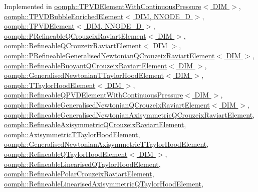 Implemented in \hyperlink{classoomph_1_1TPVDElementWithContinuousPressure_a3be09b442e13efa2e91f936e59034670}{oomph\+::\+T\+P\+V\+D\+Element\+With\+Continuous\+Pressure$<$ D\+I\+M $>$}, \hyperlink{classoomph_1_1TPVDBubbleEnrichedElement_ab8cb112f848a59cd54f14e72143927eb}{oomph\+::\+T\+P\+V\+D\+Bubble\+Enriched\+Element$<$ D\+I\+M, N\+N\+O\+D\+E\+\_\+D $>$}, \hyperlink{classoomph_1_1TPVDElement_aa23910847f4faa1d3701756c0f5a1e58}{oomph\+::\+T\+P\+V\+D\+Element$<$ D\+I\+M, N\+N\+O\+D\+E\+\_\+D $>$}, \hyperlink{classoomph_1_1PRefineableQCrouzeixRaviartElement_a4f29431659c8fb00cd2b56b21bcb722c}{oomph\+::\+P\+Refineable\+Q\+Crouzeix\+Raviart\+Element$<$ D\+I\+M $>$}, \hyperlink{classoomph_1_1RefineableQCrouzeixRaviartElement_aca4403f291e107cfcbf34009647c0527}{oomph\+::\+Refineable\+Q\+Crouzeix\+Raviart\+Element$<$ D\+I\+M $>$}, \hyperlink{classoomph_1_1PRefineableGeneralisedNewtonianQCrouzeixRaviartElement_ad41a2cd5f7ba136c2db47404e23b3bff}{oomph\+::\+P\+Refineable\+Generalised\+Newtonian\+Q\+Crouzeix\+Raviart\+Element$<$ D\+I\+M $>$}, \hyperlink{classoomph_1_1RefineableBuoyantQCrouzeixRaviartElement_a868eb9a7f06469da529dbbc5b1efe34e}{oomph\+::\+Refineable\+Buoyant\+Q\+Crouzeix\+Raviart\+Element$<$ D\+I\+M $>$}, \hyperlink{classoomph_1_1GeneralisedNewtonianTTaylorHoodElement_aa01c42f2e33c0fe78dfedceadd7ae78e}{oomph\+::\+Generalised\+Newtonian\+T\+Taylor\+Hood\+Element$<$ D\+I\+M $>$}, \hyperlink{classoomph_1_1TTaylorHoodElement_a88de8397e5afde8e3d5bb2639d1b91ff}{oomph\+::\+T\+Taylor\+Hood\+Element$<$ D\+I\+M $>$}, \hyperlink{classoomph_1_1RefineableQPVDElementWithContinuousPressure_a4cf706224993a10a0c774a314d4c25c4}{oomph\+::\+Refineable\+Q\+P\+V\+D\+Element\+With\+Continuous\+Pressure$<$ D\+I\+M $>$}, \hyperlink{classoomph_1_1RefineableGeneralisedNewtonianQCrouzeixRaviartElement_ac4a1100a3a8dc6f4994b622e50a76166}{oomph\+::\+Refineable\+Generalised\+Newtonian\+Q\+Crouzeix\+Raviart\+Element$<$ D\+I\+M $>$}, \hyperlink{classoomph_1_1RefineableGeneralisedNewtonianAxisymmetricQCrouzeixRaviartElement_a82be46c378226d5588fe8aeda0cef491}{oomph\+::\+Refineable\+Generalised\+Newtonian\+Axisymmetric\+Q\+Crouzeix\+Raviart\+Element}, \hyperlink{classoomph_1_1RefineableAxisymmetricQCrouzeixRaviartElement_a45ed9a2e816c20c88fd9f375899657c3}{oomph\+::\+Refineable\+Axisymmetric\+Q\+Crouzeix\+Raviart\+Element}, \hyperlink{classoomph_1_1AxisymmetricTTaylorHoodElement_a2a8cccdcdfd71e3c5f4c4ce07189442c}{oomph\+::\+Axisymmetric\+T\+Taylor\+Hood\+Element}, \hyperlink{classoomph_1_1GeneralisedNewtonianAxisymmetricTTaylorHoodElement_a0630c3c5533051b6f0e348571bd0c3ce}{oomph\+::\+Generalised\+Newtonian\+Axisymmetric\+T\+Taylor\+Hood\+Element}, \hyperlink{classoomph_1_1RefineableQTaylorHoodElement_a216582f193bf05ba8baf3ef3683da788}{oomph\+::\+Refineable\+Q\+Taylor\+Hood\+Element$<$ D\+I\+M $>$}, \hyperlink{classoomph_1_1RefineableLinearisedQTaylorHoodElement_ad2f150987cca5fb4d8e64fdec5fe3f65}{oomph\+::\+Refineable\+Linearised\+Q\+Taylor\+Hood\+Element}, \hyperlink{classoomph_1_1RefineablePolarCrouzeixRaviartElement_a1e444d850f0b74355b1474fd49f239d1}{oomph\+::\+Refineable\+Polar\+Crouzeix\+Raviart\+Element}, \hyperlink{classoomph_1_1RefineableLinearisedAxisymmetricQTaylorHoodElement_add76773c8f20bd70e3b3d3aa23dcca6d}{oomph\+::\+Refineable\+Linearised\+Axisymmetric\+Q\+Taylor\+Hood\+Element}, 